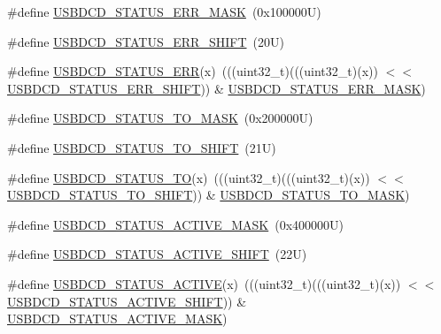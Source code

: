 \begin{DoxyCompactItemize}
\#define \mbox{\hyperlink{group___u_s_b_d_c_d___register___masks_gaa0a0297c32e8af91d40e8cba8ffe8d1e}{U\+S\+B\+D\+C\+D\+\_\+\+S\+T\+A\+T\+U\+S\+\_\+\+E\+R\+R\+\_\+\+M\+A\+SK}}~(0x100000\+U)
\item 
\#define \mbox{\hyperlink{group___u_s_b_d_c_d___register___masks_gac82e47386e1af144b9e4d579bacfca50}{U\+S\+B\+D\+C\+D\+\_\+\+S\+T\+A\+T\+U\+S\+\_\+\+E\+R\+R\+\_\+\+S\+H\+I\+FT}}~(20\+U)
\item 
\#define \mbox{\hyperlink{group___u_s_b_d_c_d___register___masks_gacd700d5055cf0e652d410253140f0f1f}{U\+S\+B\+D\+C\+D\+\_\+\+S\+T\+A\+T\+U\+S\+\_\+\+E\+RR}}(x)~(((uint32\+\_\+t)(((uint32\+\_\+t)(x)) $<$$<$ \mbox{\hyperlink{group___u_s_b_d_c_d___register___masks_gac82e47386e1af144b9e4d579bacfca50}{U\+S\+B\+D\+C\+D\+\_\+\+S\+T\+A\+T\+U\+S\+\_\+\+E\+R\+R\+\_\+\+S\+H\+I\+FT}})) \& \mbox{\hyperlink{group___u_s_b_d_c_d___register___masks_gaa0a0297c32e8af91d40e8cba8ffe8d1e}{U\+S\+B\+D\+C\+D\+\_\+\+S\+T\+A\+T\+U\+S\+\_\+\+E\+R\+R\+\_\+\+M\+A\+SK}})
\item 
\#define \mbox{\hyperlink{group___u_s_b_d_c_d___register___masks_ga69616f9e6fd32921dee0543a3cfde633}{U\+S\+B\+D\+C\+D\+\_\+\+S\+T\+A\+T\+U\+S\+\_\+\+T\+O\+\_\+\+M\+A\+SK}}~(0x200000\+U)
\item 
\#define \mbox{\hyperlink{group___u_s_b_d_c_d___register___masks_ga2b59871476643f7c428868c6ebbcef5a}{U\+S\+B\+D\+C\+D\+\_\+\+S\+T\+A\+T\+U\+S\+\_\+\+T\+O\+\_\+\+S\+H\+I\+FT}}~(21\+U)
\item 
\#define \mbox{\hyperlink{group___u_s_b_d_c_d___register___masks_ga6f2121154cf1ce1dbbc207ca8e5d3a0e}{U\+S\+B\+D\+C\+D\+\_\+\+S\+T\+A\+T\+U\+S\+\_\+\+TO}}(x)~(((uint32\+\_\+t)(((uint32\+\_\+t)(x)) $<$$<$ \mbox{\hyperlink{group___u_s_b_d_c_d___register___masks_ga2b59871476643f7c428868c6ebbcef5a}{U\+S\+B\+D\+C\+D\+\_\+\+S\+T\+A\+T\+U\+S\+\_\+\+T\+O\+\_\+\+S\+H\+I\+FT}})) \& \mbox{\hyperlink{group___u_s_b_d_c_d___register___masks_ga69616f9e6fd32921dee0543a3cfde633}{U\+S\+B\+D\+C\+D\+\_\+\+S\+T\+A\+T\+U\+S\+\_\+\+T\+O\+\_\+\+M\+A\+SK}})
\item 
\#define \mbox{\hyperlink{group___u_s_b_d_c_d___register___masks_ga6127ac2a4e36e01dfe2c939203f8a72f}{U\+S\+B\+D\+C\+D\+\_\+\+S\+T\+A\+T\+U\+S\+\_\+\+A\+C\+T\+I\+V\+E\+\_\+\+M\+A\+SK}}~(0x400000\+U)
\item 
\#define \mbox{\hyperlink{group___u_s_b_d_c_d___register___masks_ga77f2a6e381b526f9d70e13cdf21332a5}{U\+S\+B\+D\+C\+D\+\_\+\+S\+T\+A\+T\+U\+S\+\_\+\+A\+C\+T\+I\+V\+E\+\_\+\+S\+H\+I\+FT}}~(22\+U)
\item 
\#define \mbox{\hyperlink{group___u_s_b_d_c_d___register___masks_ga6a4bf61c1f807b4f1e77dc8a370bdefd}{U\+S\+B\+D\+C\+D\+\_\+\+S\+T\+A\+T\+U\+S\+\_\+\+A\+C\+T\+I\+VE}}(x)~(((uint32\+\_\+t)(((uint32\+\_\+t)(x)) $<$$<$ \mbox{\hyperlink{group___u_s_b_d_c_d___register___masks_ga77f2a6e381b526f9d70e13cdf21332a5}{U\+S\+B\+D\+C\+D\+\_\+\+S\+T\+A\+T\+U\+S\+\_\+\+A\+C\+T\+I\+V\+E\+\_\+\+S\+H\+I\+FT}})) \& \mbox{\hyperlink{group___u_s_b_d_c_d___register___masks_ga6127ac2a4e36e01dfe2c939203f8a72f}{U\+S\+B\+D\+C\+D\+\_\+\+S\+T\+A\+T\+U\+S\+\_\+\+A\+C\+T\+I\+V\+E\+\_\+\+M\+A\+SK}})
\end{DoxyCompactItemize}
